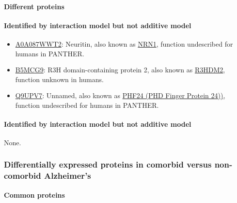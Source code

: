 \paragraph{Different proteins}

\paragraph{Identified by interaction model but not additive model}

\begin{itemize}
\item \href{http://www.pantherdb.org/genes/gene.do?acc=HUMAN\%7CHGNC\%3D17972\%7CUniProtKB\%3DQ9NPD7}{A0A087WWT2}: Neuritin, also known as \href{https://www.uniprot.org/uniprot/A0A087WWT2}{NRN1}, function undescribed for humans in PANTHER.
\item \href{http://www.pantherdb.org/genes/gene.do?acc=HUMAN\%7CHGNC\%3D29167\%7CUniProtKB\%3DQ9Y2K5}{B5MCG9}: R3H domain-containing protein 2, also known as \href{https://www.uniprot.org/uniprot/B5MCG9}{R3HDM2}, function unknown in humans.
\item \href{http://www.pantherdb.org/genes/gene.do?acc=HUMAN\%7CHGNC\%3D29180\%7CUniProtKB\%3DQ9UPV7}{Q9UPV7}: Unnamed, also known as \href{https://www.uniprot.org/uniprot/Q9UPV7}{PHF24 (PHD Finger Protein 24))}, function undescribed for humans in PANTHER.
\end{itemize}

\paragraph{Identified by interaction model but not additive model}

None.

\subsubsection{Differentially expressed proteins in comorbid versus non-comorbid Alzheimer's}
\label{sec:diff-expr-prot}

\paragraph{Common proteins}

